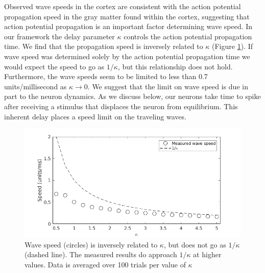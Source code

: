 \documentclass[a4paper,11pt]{article}
\begin{document}
Observed wave speeds in the cortex are consistent with the action potential propagation speed in the gray matter found within the cortex, suggesting that action potential propagation is an important factor determining wave speed.
In our framework the delay parameter $\kappa$ controls the action potential propagation time. 
We find that the propagation speed is inversely related to $\kappa$ (Figure \ref{fig:delay_speed}).
If wave speed was determined solely by the action potential propagation time we would expect the speed to go as $1/\kappa$, but this relationship does not hold.
Furthermore, the wave speeds seem to be limited to less than 0.7 units/millisecond as $\kappa \rightarrow 0$.
We suggest that the limit on wave speed is due in part to the neuron dynamics. 
As we discuss below, our neurons take time to spike after receiving a stimulus that displaces the neuron from equilibrium.
This inherent delay places a speed limit on the traveling waves.

\begin{figure}[!htb]
 \caption{Wave speed (circles) is inversely related to $\kappa$, but does not go as $1/\kappa$ (dashed line). The measured results do approach $1/\kappa$ at higher values. Data is averaged over 100 trials per value of $\kappa$}
 \label{fig:delay_speed}
 \centering
   \includegraphics[width=\textwidth]{fig/WaveSpeed_Delay}
\end{figure}

\FloatBarrier
\end{document}
